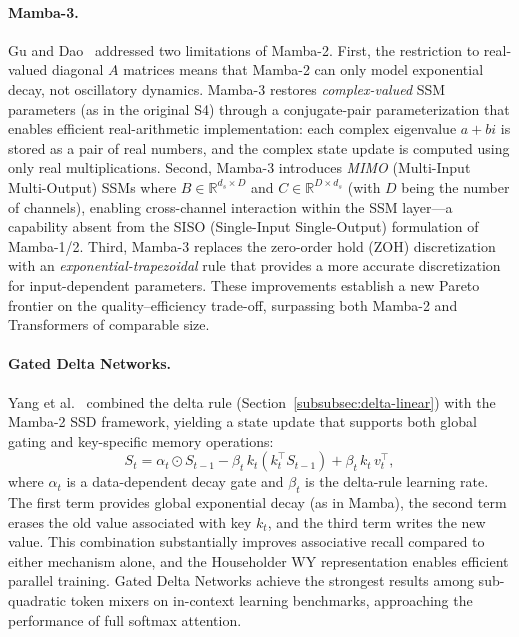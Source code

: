 \paragraph{Mamba-3.}
Gu and Dao~\cite{gu2025mamba3} addressed two limitations of Mamba-2. First, the restriction to real-valued diagonal $A$ matrices means that Mamba-2 can only model exponential decay, not oscillatory dynamics. Mamba-3 restores \emph{complex-valued} SSM parameters (as in the original S4) through a conjugate-pair parameterization that enables efficient real-arithmetic implementation: each complex eigenvalue $a + bi$ is stored as a pair of real numbers, and the complex state update is computed using only real multiplications. Second, Mamba-3 introduces \emph{MIMO} (Multi-Input Multi-Output) SSMs where $B \in \mathbb{R}^{d_s \times D}$ and $C \in \mathbb{R}^{D \times d_s}$ (with $D$ being the number of channels), enabling cross-channel interaction within the SSM layer---a capability absent from the SISO (Single-Input Single-Output) formulation of Mamba-1/2. Third, Mamba-3 replaces the zero-order hold (ZOH) discretization with an \emph{exponential-trapezoidal} rule that provides a more accurate discretization for input-dependent parameters. These improvements establish a new Pareto frontier on the quality--efficiency trade-off, surpassing both Mamba-2 and Transformers of comparable size.

\paragraph{Gated Delta Networks.}
Yang et al.~\cite{yang2024gated} combined the delta rule (Section~\ref{subsubsec:delta-linear}) with the Mamba-2 SSD framework, yielding a state update that supports both global gating and key-specific memory operations:
\begin{equation}
S_t = \alpha_t \odot S_{t-1} - \beta_t\, k_t (k_t^\top S_{t-1}) + \beta_t\, k_t\, v_t^\top,
\label{eq:gated-delta-ssm}
\end{equation}
where $\alpha_t$ is a data-dependent decay gate and $\beta_t$ is the delta-rule learning rate. The first term provides global exponential decay (as in Mamba), the second term erases the old value associated with key $k_t$, and the third term writes the new value. This combination substantially improves associative recall compared to either mechanism alone, and the Householder WY representation enables efficient parallel training. Gated Delta Networks achieve the strongest results among sub-quadratic token mixers on in-context learning benchmarks, approaching the performance of full softmax attention.

